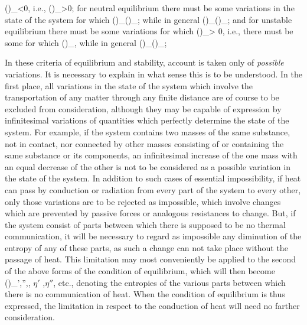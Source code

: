 \documentclass[12pt]{memoir}
\begin{document}
\eqs
(\Delta \eta)_\epsilon<0, i.e., (\Delta \epsilon)_\eta>0;      \label{3}
\eqe
for neutral equilibrium there must be some variations in the state of the system for which
\eqs
(\Delta \eta)_(\Delta \epsilon)_;  \label{4}
\eqe
while in general
\eqs
(\Delta \eta)_\epsilon {}(\Delta \epsilon)_\eta {}; \label{5}
\eqe
and for unstable equilibrium there must be some variations for which
\eqs
(\Delta \eta)_\epsilon > 0,        \label{6}
\eqe
i.e., there must be some for which
\eqs
(\Delta \epsilon)_\eta,         \label{7}
\eqe
while in general
\eqs
(\delta \eta)_\epsilon {}(\delta \epsilon)_\eta {};\label{8}
\eqe

In these criteria of equilibrium and stability, account is taken only of \emph{possible} variations. It is necessary to explain in what sense this is to be understood. In the first place, all variations in the state of the system which involve the transportation of any matter through any finite distance are of course to be excluded from consideration, although they may be capable of expression by infinitesimal variations of quantities which perfectly determine the state of the system. For example, if the system contains two masses of the same substance, not in contact, nor connected by other masses consisting of or containing the same substance or its components, an infinitesimal increase of the one mass with an equal decrease of the other is not to be considered as a possible variation in the state of the system. In addition to such cases of essential impossibility, if heat can pass by conduction or radiation from every part of the system to every other, only those variations are to be rejected as impossible, which involve changes which are prevented by passive forces or analogous resistances to change. But, if the system consist of parts between which there is supposed to be no thermal communication, it will be necessary to regard as impossible any diminution of the entropy of any of these parts, as such a change can not take place without the passage of heat. This limitation may most conveniently be applied to the second of the above forms of the condition of equilibrium, which will then become
\eqs
(\delta \epsilon)_{\eta',\eta'',}, \label{9}
\eqe
$\eta'$ ,$\eta''$, etc., denoting the entropies of the various parts between which there is no communication of heat. When the condition of equilibrium is thus expressed, the limitation in respect to the conduction of heat will need no farther consideration.
\end{document}
